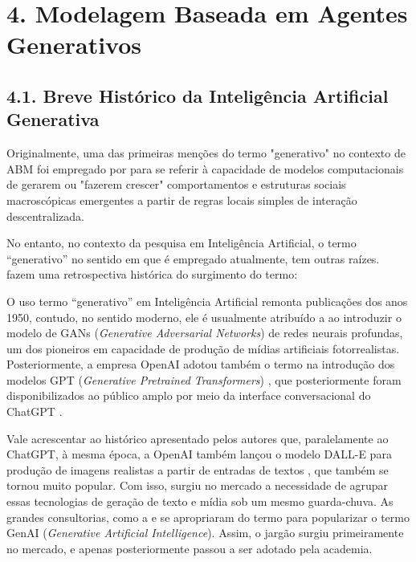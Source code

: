 \documentclass[12pt,oneside,a4paper,brazil,sumario=tradicional]{abntex2}
\begin{document}
\section*{4. Modelagem Baseada em Agentes Generativos}
\subsection*{4.1. Breve Histórico da Inteligência Artificial Generativa}
Originalmente, uma das primeiras menções do termo "generativo" no contexto de ABM foi empregado por  para se referir à capacidade de modelos computacionais de gerarem ou "fazerem crescer" comportamentos e estruturas sociais macroscópicas emergentes a partir de regras locais simples de interação descentralizada.

No entanto, no contexto da pesquisa em Inteligência Artificial, o termo “generativo” no sentido em que é empregado atualmente, tem outras raízes.  fazem uma retrospectiva histórica do surgimento do termo:

O uso termo “generativo” em Inteligência Artificial remonta publicações dos anos 1950, contudo, no sentido moderno, ele é usualmente atribuído a  ao introduzir o modelo de GANs (\textit{Generative Adversarial Networks}) de redes neurais profundas, um dos pioneiros em capacidade de produção de mídias artificiais fotorrealistas. Posteriormente, a empresa OpenAI adotou também o termo na introdução dos modelos GPT (\textit{Generative Pretrained Transformers}) \cite{radford2018}, que posteriormente foram disponibilizados ao público amplo por meio da interface conversacional do ChatGPT \cite{openai2022}.

Vale acrescentar ao histórico apresentado pelos autores que, paralelamente ao ChatGPT, à mesma época, a OpenAI também lançou o modelo DALL-E para produção de imagens realistas a partir de entradas de textos \cite{ramesh2021}, que também se tornou muito popular. Com isso, surgiu no mercado a necessidade de agrupar essas tecnologias de geração de texto e mídia sob um mesmo guarda-chuva. As grandes consultorias, como a  e  se apropriaram do termo para popularizar o termo GenAI (\textit{Generative Artificial Intelligence}). Assim, o jargão surgiu primeiramente no mercado, e apenas posteriormente passou a ser adotado pela academia.
\end{document}
